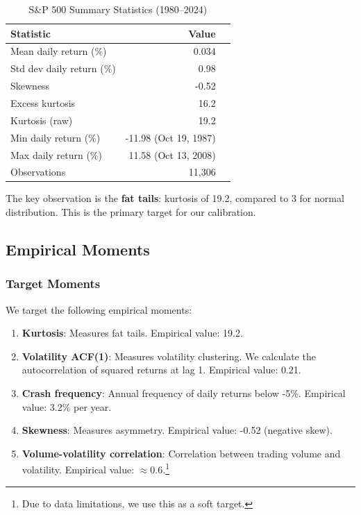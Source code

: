 \begin{table}[ht]
\centering
\caption{S\&P 500 Summary Statistics (1980--2024)}
\label{tab:summary}
\begin{tabular}{lrr}
\hline\hline
Statistic & Value \\
\hline
Mean daily return (\%) & 0.034 \\
Std dev daily return (\%) & 0.98 \\
Skewness & -0.52 \\
Excess kurtosis & 16.2 \\
Kurtosis (raw) & 19.2 \\
Min daily return (\%) & -11.98 (Oct 19, 1987) \\
Max daily return (\%) & 11.58 (Oct 13, 2008) \\
Observations & 11,306 \\
\hline\hline
\end{tabular}
\end{table}

The key observation is the \textbf{fat tails}: kurtosis of 19.2, compared to 3 for normal distribution. This is the primary target for our calibration.

\subsection{Empirical Moments}

\subsubsection{Target Moments}

We target the following empirical moments:

\begin{enumerate}
    \item \textbf{Kurtosis}: Measures fat tails. Empirical value: 19.2.
    
    \item \textbf{Volatility ACF(1)}: Measures volatility clustering. We calculate the autocorrelation of squared returns at lag 1. Empirical value: 0.21.
    
    \item \textbf{Crash frequency}: Annual frequency of daily returns below -5\%. Empirical value: 3.2\% per year.
    
    \item \textbf{Skewness}: Measures asymmetry. Empirical value: -0.52 (negative skew).
    
    \item \textbf{Volume-volatility correlation}: Correlation between trading volume and volatility. Empirical value: $\approx 0.6$.\footnote{Due to data limitations, we use this as a soft target.}
\end{enumerate}

